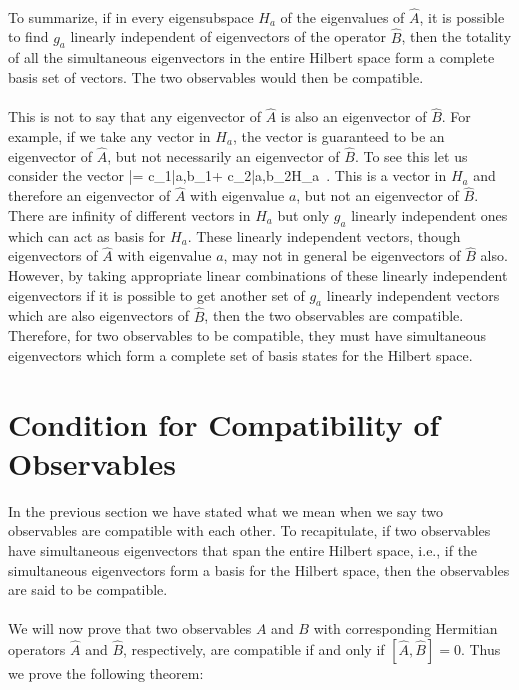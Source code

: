 \paragraph{}
To summarize, if in every  eigensubspace $H_a$ of the eigenvalues of $\hat{A}$, it is possible to find $g_a$ linearly independent of eigenvectors of the operator $\hat{B}$, then the totality of all the simultaneous eigenvectors in the entire Hilbert space form a complete basis set of vectors. The two observables would then be compatible. 


\paragraph{}
This is not to say that any eigenvector 
of $\hat{A}$ is also an eigenvector of $\hat{B}$. For example, if we take any vector in $H_a$, the vector is guaranteed to be an eigenvector of $\hat{A}$, but not necessarily an eigenvector of $\hat{B}$. To see this let us consider the vector
\be
|\psi\rangle = c_1|a,b_1\rangle + c_2|a,b_2\rangle \in H_a\, .
\ee
This is a vector in $H_a$ and therefore an eigenvector of $\hat{A}$ with eigenvalue $a$, but not an eigenvector of $\hat{B}$. 
There are infinity of different vectors in $H_a$ but only $g_a$ linearly independent ones which can act as basis for $H_a$. 
These linearly independent vectors,  though eigenvectors of $\hat{A}$ with eigenvalue $a$, may not in general  be eigenvectors of $\hat{B}$ also. However, by taking appropriate linear combinations of these linearly independent eigenvectors if it is
possible to get another set of $g_a$ linearly independent vectors which are also eigenvectors of $\hat{B}$, then the two observables are compatible. Therefore, for two observables to be compatible, they must have simultaneous eigenvectors which form
a complete set of basis states for the Hilbert space.




\section{Condition for Compatibility of Observables}
In the previous section we have stated what we mean when we say two observables are compatible with each other.
To recapitulate, if two observables have simultaneous eigenvectors that span the entire Hilbert space, i.e., if the simultaneous 
eigenvectors form a basis for the Hilbert space, then the observables are said to be compatible.

\paragraph{} 
We will now prove that two observables $A$ and $B$ with corresponding Hermitian operators $\hat{A}$ and $\hat{B}$, respectively,  
 are compatible if and only if $[\hat{A},\hat{B}]=0$. Thus we prove the following theorem:

